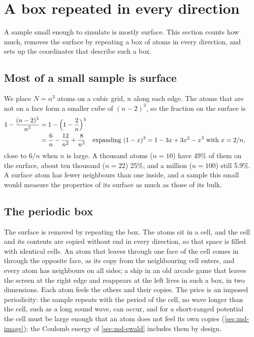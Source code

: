 \section{A box repeated in every direction}
\label{sec:md-periodic}

A sample small enough to simulate is mostly surface. This section counts
how much, removes the surface by repeating a box of atoms in every
direction, and sets up the coordinates that describe such a box.

\subsection*{Most of a small sample is surface}

We place $N = n^3$ atoms on a cubic grid, $n$ along each edge. The atoms that
are not on a face form a smaller cube of $(n - 2)^3$, so the fraction on
the surface is
\begin{align*}
   1 - \frac{(n - 2)^3}{n^3} &= 1 - \Bigl(1 - \frac2n\Bigr)^3\\
   &= \frac6n - \frac{12}{n^2} + \frac8{n^3}
   && \text{expanding $(1 - x)^3 = 1 - 3x + 3x^2 - x^3$ with $x = 2/n$,}
\end{align*}
close to $6/n$ when $n$ is large. A thousand atoms ($n = 10$) have 49\%
of them on the surface, about ten thousand ($n = 22$) 25\%, and a million ($n =
100$) still 5.9\%. A surface atom has fewer neighbours than one inside,
and a sample this small would measure the properties of its surface as
much as those of its bulk.

\subsection*{The periodic box}

The surface is removed by repeating the box. The atoms sit in a cell,
and the cell and its contents are copied without end in every direction,
so that space is filled with identical cells. An atom that leaves through
one face of the cell comes in through the opposite face, as its copy from
the neighbouring cell enters, and every atom has neighbours on all sides;
a ship in an old arcade game that leaves the screen at the right edge and
reappears at the left lives in such a box, in two dimensions. Each atom
feels the others and their copies. The price is an imposed periodicity:
the sample repeats with the period of the cell, no wave longer than the
cell, such as a long sound wave, can occur, and for a short-ranged
potential the cell must be large enough that an atom does not feel its
own copies (\cref{sec:md-image}); the Coulomb energy of
\cref{sec:md-ewald} includes them by design.


